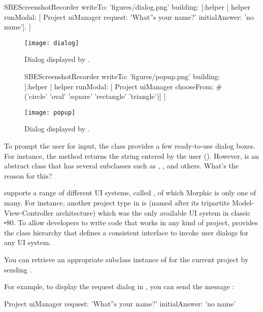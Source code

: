 \documentclass[a4paper,10pt,twoside]{book}
\begin{document}
\begin{ExecuteSmalltalkScript}
SBEScreenshotRecorder writeTo: 'figures/dialog.png' building: [:helper |
	helper runModal: [
		Project uiManager
			request: 'What''s your name?'
			initialAnswer: 'no name'].
]
\end{ExecuteSmalltalkScript}
\begin{figure}
\centering
\begin{minipage}[t]{0.35\textwidth}
	\centerline{\texttt{[image: dialog]}}
	\caption{Dialog displayed by .
		\label{fig:dialogName}}
\end{minipage}
\hfill
\begin{ExecuteSmalltalkScript}
SBEScreenshotRecorder writeTo: 'figures/popup.png' building: [:helper |
	helper runModal: [
		Project uiManager
			chooseFrom: #('circle' 'oval' 'square' 'rectangle' 'triangle')]
]
\end{ExecuteSmalltalkScript}
\begin{minipage}[t]{0.56\textwidth}
	\centerline{\texttt{[image: popup]}}
	\caption{Dialog displayed by .
		\label{fig:dialogChoosing}}
\end{minipage}
\end{figure}

To prompt the user for input, the  class provides a few ready-to-use dialog boxes.
For instance, the  method returns the string entered by the user ().
However,  is an abstract class that has several subclasses such as , , and others.
What's the reason for this?

\sq supports a range of different UI systems, called \emph{}, of which Morphic is only one of many.
For instance, another project type in \sq is \emph{} (named after its tripartite Model-View-Controller architecture) which was the only available UI system in classic \st-80.
To allow developers to write code that works in any kind of project, \sq provides the  class hierarchy that defines a consistent interface to invoke user dialogs for any UI system.

You can retrieve an appropriate subclass instance of  for the current project by sending .

For example, to display the request dialog in , you can send the message :
\begin{code}{}
Project uiManager
	request: 'What''s your name?'
	initialAnswer: 'no name'
\end{code}
\end{document}
